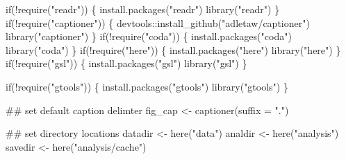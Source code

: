 \documentclass[11pt,]{article}
\newenvironment{Shaded}{}{}
\newcommand{\KeywordTok}[1]{\textcolor[rgb]{0.00,0.00,1.00}{#1}}
\newcommand{\DataTypeTok}[1]{#1}
\newcommand{\StringTok}[1]{\textcolor[rgb]{0.00,0.50,0.50}{#1}}
\newcommand{\ControlFlowTok}[1]{\textcolor[rgb]{0.00,0.00,1.00}{#1}}
\newcommand{\OperatorTok}[1]{#1}
\newcommand{\NormalTok}[1]{#1}
\begin{document}
\begin{Shaded}
\begin{Highlighting}[]
\ControlFlowTok{if}\NormalTok{(}\OperatorTok{!}\KeywordTok{require}\NormalTok{(}\StringTok{"readr"}\NormalTok{)) \{}
  \KeywordTok{install.packages}\NormalTok{(}\StringTok{"readr"}\NormalTok{)}
  \KeywordTok{library}\NormalTok{(}\StringTok{"readr"}\NormalTok{)}
\NormalTok{\}}
\ControlFlowTok{if}\NormalTok{(}\OperatorTok{!}\KeywordTok{require}\NormalTok{(}\StringTok{"captioner"}\NormalTok{)) \{}
\NormalTok{  devtools}\OperatorTok{::}\KeywordTok{install_github}\NormalTok{(}\StringTok{"adletaw/captioner"}\NormalTok{)}
  \KeywordTok{library}\NormalTok{(}\StringTok{"captioner"}\NormalTok{)}
\NormalTok{\}}
\ControlFlowTok{if}\NormalTok{(}\OperatorTok{!}\KeywordTok{require}\NormalTok{(}\StringTok{"coda"}\NormalTok{)) \{}
  \KeywordTok{install.packages}\NormalTok{(}\StringTok{"coda"}\NormalTok{)}
  \KeywordTok{library}\NormalTok{(}\StringTok{"coda"}\NormalTok{)}
\NormalTok{\}}
\ControlFlowTok{if}\NormalTok{(}\OperatorTok{!}\KeywordTok{require}\NormalTok{(}\StringTok{"here"}\NormalTok{)) \{}
  \KeywordTok{install.packages}\NormalTok{(}\StringTok{"here"}\NormalTok{)}
  \KeywordTok{library}\NormalTok{(}\StringTok{"here"}\NormalTok{)}
\NormalTok{\}}
\ControlFlowTok{if}\NormalTok{(}\OperatorTok{!}\KeywordTok{require}\NormalTok{(}\StringTok{"gsl"}\NormalTok{)) \{}
  \KeywordTok{install.packages}\NormalTok{(}\StringTok{"gsl"}\NormalTok{)}
  \KeywordTok{library}\NormalTok{(}\StringTok{"gsl"}\NormalTok{)}
\NormalTok{\}}

\ControlFlowTok{if}\NormalTok{(}\OperatorTok{!}\KeywordTok{require}\NormalTok{(}\StringTok{"gtools"}\NormalTok{)) \{}
  \KeywordTok{install.packages}\NormalTok{(}\StringTok{"gtools"}\NormalTok{)}
  \KeywordTok{library}\NormalTok{(}\StringTok{"gtools"}\NormalTok{)}
\NormalTok{\}}


\NormalTok{## set default caption delimter}
\NormalTok{fig_cap <-}\StringTok{ }\KeywordTok{captioner}\NormalTok{(}\DataTypeTok{suffix =} \StringTok{"."}\NormalTok{)}

\NormalTok{## set directory locations}
\NormalTok{datadir <-}\StringTok{ }\KeywordTok{here}\NormalTok{(}\StringTok{"data"}\NormalTok{)}
\NormalTok{analdir <-}\StringTok{ }\KeywordTok{here}\NormalTok{(}\StringTok{"analysis"}\NormalTok{)}
\NormalTok{savedir <-}\StringTok{ }\KeywordTok{here}\NormalTok{(}\StringTok{"analysis/cache"}\NormalTok{)}


\end{Highlighting}
\end{Shaded}
\end{document}
